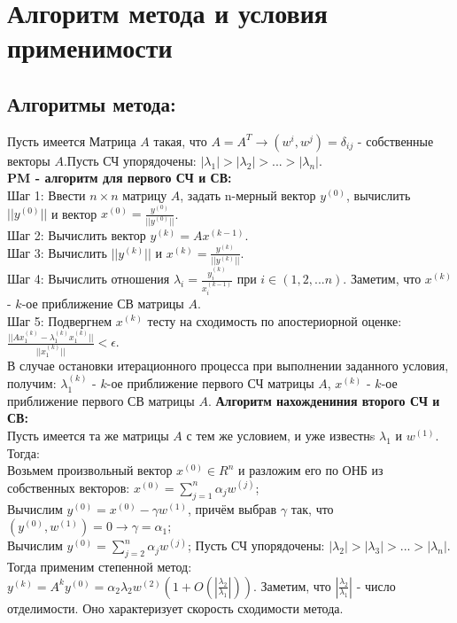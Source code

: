 \documentclass[12pt]{article}
\begin{document}
\section{Алгоритм метода и условия применимости}
\subsection{Алгоритмы метода:}
Пусть имеется Матрица $A$ такая, что $\displaystyle A = A^T \rightarrow (w^{i},w^{j}) = \delta_{ij}$ - собственные векторы $A$.Пусть СЧ упорядочены: $|\lambda_1| >|\lambda_2| > ... > |\lambda_n|$.\\
\textbf{PM - алгоритм для первого СЧ и СВ:}\\
Шаг 1: Ввести $n\times n$ матрицу $A$, задать n-мерный вектор $y^{(0)}$, вычислить $\displaystyle||y^{(0)}||$ и вектор $\displaystyle x^{(0)} = \frac{y^{(0)}}{||y^{(0)}||}$.\\
Шаг 2: Вычислить вектор $\displaystyle y^{(k)} = Ax^{(k-1)}$.\\
Шаг 3: Вычислить $||y^{(k)}||$ и $\displaystyle x^{(k)} = \frac{y^{(k)}}{||y^{(k)}||}$.\\
Шаг 4: Вычислить отношения $\displaystyle \lambda_i = \frac{y^{(k)}_i}{x^{(k-1)}_i}$ при $i \in (1,2,... n)$. 
Заметим, что $x^{(k)}$ - $k$-ое приближение СВ матрицы $A$.\\
Шаг 5: Подвергнем  $x^{(k)}$ тесту на сходимость по апостериорной оценке: $\displaystyle \frac{||Ax_1^{(k)}-\lambda_1^{(k)}x_1^{(k)}||}{||x_1^{(k)}||}< \epsilon$.\\
В случае остановки итерационного процесса при выполнении заданного условия, получим: $\lambda_1^{(k)}$ - $k$-ое приближение первого СЧ матрицы $A$, $x^{(k)}$ - $k$-ое приближение первого СВ матрицы $A$.
\textbf{Алгоритм нахождениния второго СЧ и СВ:}\\ 
Пусть имеется та же матрицы $A$ с тем же условием, и уже известнs $\lambda_1$ и $w^{(1)}$. Тогда:\\
Возьмем произвольный вектор $x^{(0)}\in R^n$ и разложим его по ОНБ из собственных векторов:  $\displaystyle x^{(0)}= \sum\limits_{j=1}^n \alpha_j w^{(j)}$;\\
Вычислим $y^{(0)} = x^{(0)} - \gamma w^{(1)}$, причём выбрав $\gamma$ так, что $(y^{(0)},w^{(1)}) = 0 \rightarrow\gamma =\alpha_1$;\\
Вычислим $y^{(0)} =\sum\limits_{j=2}^n \alpha_j w^{(j)}$;
Пусть СЧ упорядочены: $|\lambda_2| >|\lambda_3| > ... > |\lambda_n|$.\\
Тогда применим степенной метод:\\ $\displaystyle y^{(k)} = A^k y^{(0)} = \alpha_2\lambda_2w^{(2)}(1+ O(|\frac{\lambda_2}{\lambda_1}|))$. Заметим, что $|\frac{\lambda_2}{\lambda_1}|$ - число отделимости. Оно характеризует скорость сходимости метода.\\
\end{document}
